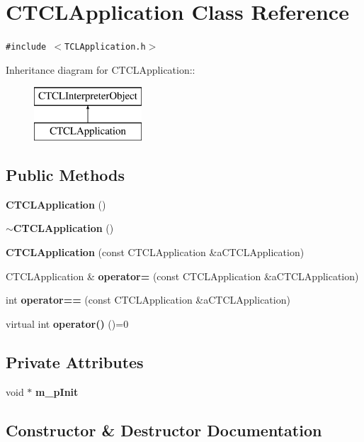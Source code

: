 \section{CTCLApplication  Class Reference}
\label{classCTCLApplication}
{\tt \#include $<$TCLApplication.h$>$}

Inheritance diagram for CTCLApplication::\begin{figure}[H]
\begin{center}
\leavevmode
\includegraphics[height=2cm]{classCTCLApplication}
\end{center}
\end{figure}
\subsection*{Public Methods}
\begin{CompactItemize}
\item 
{\bf CTCLApplication} ()
\item 
{\bf $\sim$CTCLApplication} ()
\item 
{\bf CTCLApplication} (const CTCLApplication \&a\-CTCLApplication)
\item 
CTCLApplication \& {\bf operator=} (const CTCLApplication \&a\-CTCLApplication)
\item 
int {\bf operator==} (const CTCLApplication \&a\-CTCLApplication)
\item 
virtual int {\bf operator()} ()=0
\end{CompactItemize}
\subsection*{Private Attributes}
\begin{CompactItemize}
\item 
void $\ast$ {\bf m\_\-p\-Init}
\end{CompactItemize}


\subsection{Constructor \& Destructor Documentation}
